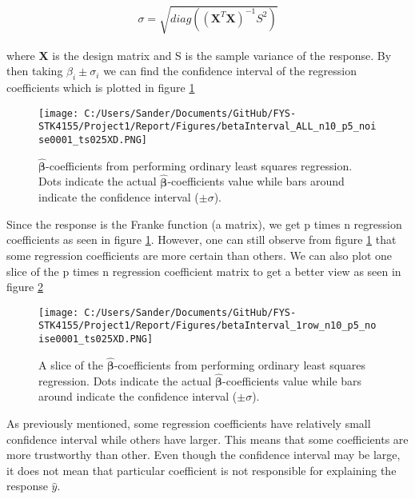\documentclass[12pt,a4paper]{article}
\begin{document}
\begin{equation}\label{eq:diagCOV}
\begin{aligned}
\sigma = \sqrt{diag((\textbf{X}^T\textbf{X})^{-1}S^2)}
\end{aligned}
\end{equation}

\noindent where \textbf{X} is the design matrix and S is the sample variance of the response. By then taking $\beta_i \pm \sigma_i$ we can find the confidence interval of the regression coefficients which is plotted in figure \ref{fig:betaIntALL1}

\begin{figure}[H]
\centering
\texttt{[image: C:/Users/Sander/Documents/GitHub/FYS-STK4155/Project1/Report/Figures/betaInterval\_ALL\_n10\_p5\_noise0001\_ts025XD.PNG]}
\caption{\label{fig:betaIntALL1} $\hat{\boldsymbol{\beta}}$-coefficients from performing ordinary least squares regression. Dots indicate the actual $\hat{\boldsymbol{\beta}}$-coefficients value while bars around indicate the confidence interval ($\pm \sigma$).}
\end{figure}

\noindent Since the response is the Franke function (a matrix), we get p times n regression coefficients as seen in figure \ref{fig:betaIntALL1}. However, one can still observe from figure \ref{fig:betaIntALL1} that some regression coefficients are more certain than others. We can also plot one slice of the p times n regression coefficient matrix to get a better view as seen in figure \ref{fig:betaIntROW1}

\begin{figure}[H]
\centering
\texttt{[image: C:/Users/Sander/Documents/GitHub/FYS-STK4155/Project1/Report/Figures/betaInterval\_1row\_n10\_p5\_noise0001\_ts025XD.PNG]}
\caption{\label{fig:betaIntROW1} A slice of the $\hat{\boldsymbol{\beta}}$-coefficients from performing ordinary least squares regression. Dots indicate the actual $\hat{\boldsymbol{\beta}}$-coefficients value while bars around indicate the confidence interval ($\pm \sigma$).}
\end{figure}

\noindent As previously mentioned, some regression coefficients have relatively small confidence interval while others have larger. This means that some coefficients are more trustworthy than other. Even though the confidence interval may be large, it does not mean that particular coefficient is not responsible for explaining the response $\hat{y}$.
\end{document}
